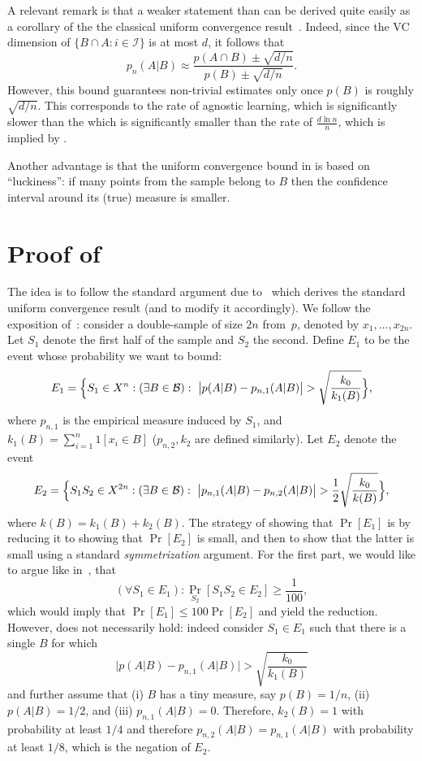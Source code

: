 \documentclass{article}
\newcommand{\B}{{\cal B}}
\newcommand{\I}{\mathcal{I}}
\begin{document}
A relevant remark is that a weaker statement than 
can be derived quite easily as a corollary of the the classical uniform convergence
result~\cite{vapnik}. 
Indeed, since the VC dimension of $\{B\cap A : i\in \I\}$ is at most $d$, it follows that 
\[p_n(A\vert B)\approx\frac{p(A\cap B) \pm \sqrt{d/n}}{p(B)\pm \sqrt{d/n}}.\]
However, this bound guarantees non-trivial estimates only once $p(B)$ is roughly $\sqrt{d/n}$.
This corresponds to the rate of agnostic learning, which is significantly slower
than the which is significantly smaller than the rate of $\frac{d\ln n}{n}$, which is implied by .

Another advantage is that  the uniform convergence bound in  is based on ``luckiness'':
if many points from the sample belong to $B$ then the confidence interval around its (true) measure is smaller. 



\section{Proof of }

The idea is to follow the standard argument due to~\cite{vapnik} 
which derives the standard uniform convergence result (and to modify it accordingly). 
We follow the exposition of~\cite{anthony}:
consider a double-sample of size $2n$ from~$p$, denoted by $x_1,\ldots,x_{2n}$.
Let $S_1$ denote the first half of the sample and $S_2$ the second.
Define $E_1$ to be the event whose probability we want to bound:
\[E_1 = \Bigl\{ S_1\in X^n : (\exists B\in \B):~ 
\bigl\lvert p(A \vert B) - p_{n,1}(A \vert B) \bigr\rvert > 
\sqrt{\frac{k_0}{k_{1}(B)}} \Bigr\},\]
where $p_{n,1}$ is the empirical measure induced by $S_1$, 
and $k_{1}(B)=\sum_{i=1}^n 1[x_i\in B]$ ($p_{n,2}, k_{2}$ are defined similarly).
Let $E_2$ denote the event
\[E_2 = 
\Bigl\{
S_1S_2\in X^{2n} : (\exists B\in\B):~
\bigl\lvert p_{n,1}(A \vert B)   -  p_{n,2}(A \vert B) \bigr\rvert >  
{\frac{1}{2}}\sqrt{\frac{k_0}{k(B)}}
\Bigr\},
\]
where $k(B) = k_{1}(B)+k_{2}(B)$.
The strategy of showing that $\Pr[E_1]$ is by reducing it to showing that $\Pr[E_2]$ 
is small, and then to show that the latter is small using a standard \emph{symmetrization} argument. 
For the first part, we would like to argue like in~\cite{anthony}, that
\begin{equation}\label{eq:anthony} 
(\forall S_1\in E_1): \Pr_{S_2}[S_1S_2\in E_2]\geq \frac{1}{100},
\end{equation}
which would imply that $\Pr[E_1]\leq 100\Pr[E_2]$ and yield the reduction.
However,  does not necessarily hold: indeed consider
$S_1\in E_1$ such that there is a single $B$ for which 
\[
\bigl\lvert p(A \vert B) - p_{n,1}(A \vert B) \bigr\rvert > 
\sqrt{\frac{k_0}{k_{1}(B)}}
\]
and further assume that 
(i) $B$ has a tiny measure, say $p(B) = 1/n$,
(ii) $p(A\vert B)= 1/2$, and
(iii) $p_{n,1}(A\vert B) = 0$.
Therefore, $k_2(B)=1$ with probability at least $1/4$
and therefore $p_{n,2}(A \vert B)=p_{n,1}(A \vert B)$
with probability at least $1/8$, which is the negation of $E_2$.
\end{document}
